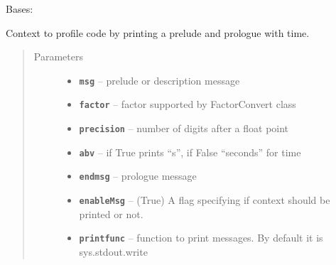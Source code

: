 \documentclass[letterpaper,10pt,english]{sphinxmanual}
\begin{document}
\begin{fulllineitems}
\label{RRtoolbox.lib:RRtoolbox.lib.root.TimeCode}
Bases: 

Context to profile code by printing a prelude and prologue with time.
\begin{quote}\begin{description}
\item[{Parameters}] \leavevmode\begin{itemize}
\item {} 
\textbf{\texttt{msg}} -- prelude or description message

\item {} 
\textbf{\texttt{factor}} -- factor supported by FactorConvert class

\item {} 
\textbf{\texttt{precision}} -- number of digits after a float point

\item {} 
\textbf{\texttt{abv}} -- if True prints ``s'', if False ``seconds'' for time

\item {} 
\textbf{\texttt{endmsg}} -- prologue message

\item {} 
\textbf{\texttt{enableMsg}} -- (True) A flag specifying if context
should be printed or not.

\item {} 
\textbf{\texttt{printfunc}} -- function to print messages. By default it
is sys.stdout.write

\end{itemize}

\end{description}\end{quote}

\begin{fulllineitems}
\label{RRtoolbox.lib:RRtoolbox.lib.root.TimeCode.time}
\end{fulllineitems}


\begin{fulllineitems}
\label{RRtoolbox.lib:RRtoolbox.lib.root.TimeCode.time_end}
\end{fulllineitems}


\end{fulllineitems}
\end{document}
